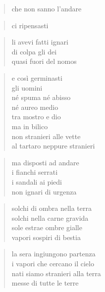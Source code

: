 	\begin{verse}
		che non sanno l’andare
	\end{verse}

\clearpage


\vspace*{2cm}

	\begin{verse}
		ci ripensasti
	\end{verse}

	\begin{verse}
		li avevi fatti ignari\\
		di colpa gli dei\\
		quasi fuori del nomos
	\end{verse}

	\begin{verse}
		e così germinasti\\
		gli uomini\\
		né spuma né abisso\\
		né aureo medio\\
		tra mostro e dio\\
		ma in bilico\\
		non stranieri alle vette\\
		al tartaro neppure stranieri
	\end{verse}

	\begin{verse}
		ma disposti ad andare\\
		i fianchi serrati\\
		i sandali ai piedi\\
		non ignari di urgenza
	\end{verse}

\clearpage


\vspace*{2cm}

	\begin{verse}
		solchi di ombra nella terra\\
		solchi nella carne gravida\\
		sole estrae ombre gialle\\
		vapori sospiri di bestia
	\end{verse}

	\begin{verse}
		la sera ingiungono partenza\\
		i vapori che cercano il cielo\\
		nati siamo stranieri alla terra\\
		messe di tutte le terre
	\end{verse}

